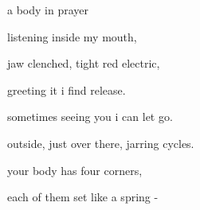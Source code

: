 \documentclass[extrafontsizes, 48pt]{memoir}
\newcommand\blankpage{%
    \null
    \thispagestyle{empty}%
    \addtocounter{page}{-1}%
    \newpage}
\begin{document}
	\begin{minipage}{.6\textwidth}
	a body in prayer
	\afterpage{\blankpage}
	\end{minipage}
	\newpage

	\begin{minipage}{.6\textwidth}
	listening inside my mouth,
	\end{minipage}
	\newpage

	\begin{minipage}{.6\textwidth}
	jaw clenched, tight red electric,
	\end{minipage}
	\newpage

	\begin{minipage}{.6\textwidth}
	greeting it i find release.
	\afterpage{\blankpage}
	\end{minipage}
	\newpage

	\begin{minipage}{.6\textwidth}
	sometimes seeing you i can let go.
	\afterpage{\blankpage}
	\end{minipage}
	\newpage

	\begin{minipage}{.6\textwidth}
	outside, just over there, jarring cycles.
	\end{minipage}
	\newpage

	\begin{minipage}{.6\textwidth}
	your body has four corners,
	\end{minipage}
	\newpage

	\begin{minipage}{.6\textwidth}
	each of them set like a spring -
	\afterpage{\blankpage}
	\end{minipage}
	\newpage
\end{document}
